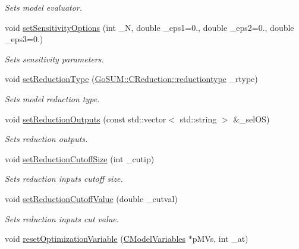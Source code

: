 \begin{DoxyCompactItemize}
\begin{DoxyCompactList}\small\item\em Sets model evaluator. \end{DoxyCompactList}\item 
void \hyperlink{class_go_s_u_m_1_1_c_container_a0c083464ff260a31ceaec12840e758ed}{set\-Sensitivity\-Options} (int \-\_\-\-N, double \-\_\-eps1=0., double \-\_\-eps2=0., double \-\_\-eps3=0.)
\begin{DoxyCompactList}\small\item\em Sets sensitivity parameters. \end{DoxyCompactList}\item 
void \hyperlink{class_go_s_u_m_1_1_c_container_acaa0e30b7ebca1b8aa7711a4447593fe}{set\-Reduction\-Type} (\hyperlink{class_go_s_u_m_1_1_c_reduction_a191434138cff8df283fa2c2e2a8e653a}{Go\-S\-U\-M\-::\-C\-Reduction\-::reductiontype} \-\_\-rtype)
\begin{DoxyCompactList}\small\item\em Sets model reduction type. \end{DoxyCompactList}\item 
void \hyperlink{class_go_s_u_m_1_1_c_container_a243099f192a3277110fc910b72c33125}{set\-Reduction\-Outputs} (const std\-::vector$<$ std\-::string $>$ \&\-\_\-sel\-O\-S)
\begin{DoxyCompactList}\small\item\em Sets reduction outputs. \end{DoxyCompactList}\item 
void \hyperlink{class_go_s_u_m_1_1_c_container_a52ac2833ad91b1a105440417648a744d}{set\-Reduction\-Cutoff\-Size} (int \-\_\-cutip)
\begin{DoxyCompactList}\small\item\em Sets reduction inputs cutoff size. \end{DoxyCompactList}\item 
void \hyperlink{class_go_s_u_m_1_1_c_container_a154f187d9c52dc8465ce18546e4bde1e}{set\-Reduction\-Cutoff\-Value} (double \-\_\-cutval)
\begin{DoxyCompactList}\small\item\em Sets reduction inputs cut value. \end{DoxyCompactList}\item 
void \hyperlink{class_go_s_u_m_1_1_c_container_ade328666a89997831a90ed068ad38bfc}{reset\-Optimization\-Variable} (\hyperlink{class_go_s_u_m_1_1_c_model_variables}{C\-Model\-Variables} $\ast$p\-M\-Vs, int \-\_\-at)

\end{DoxyCompactItemize}
